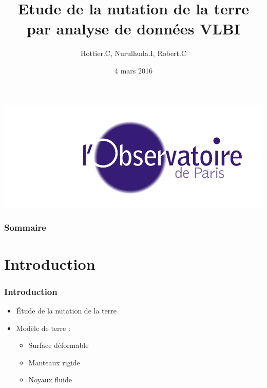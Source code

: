 \documentclass[french]{beamer}
\title[Soutenance MT3]{Etude de la nutation de la terre par analyse de données VLBI}
\author{
Hottier.C, Nurulhuda.I, Robert.C}
\date{4 mars 2016}
\newcommand{\frtt}[1]{\frametitle{#1}}
\begin{document}
\begin{frame}
  \maketitle
  \begin{center}
    \includegraphics[height=0.20\textheight]{Figures/siteon0.jpg}
  \end{center}
\end{frame}

\begin{frame}
  \frametitle{Sommaire}
  \tableofcontents
\end{frame}

\section{Introduction}

\begin{frame}
  \frtt{Introduction}

  \begin{itemize}
    \item \'Etude de la nutation de la terre 
    \item Modèle de terre :
      \begin{itemize}
        \item Surface déformable
        \item Manteaux rigide
        \item Noyaux fluide
      \end{itemize}
  \end{itemize}

\end{frame}


\end{document}
